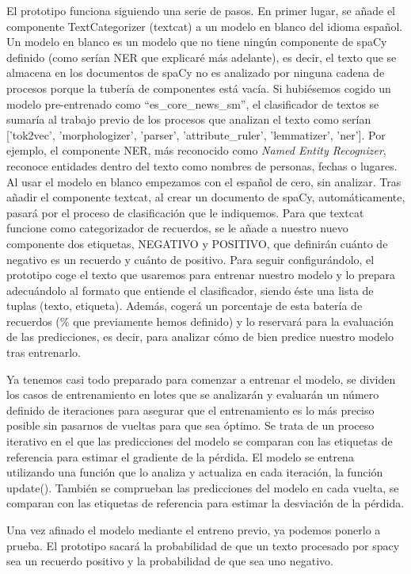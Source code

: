 El prototipo funciona siguiendo una serie de pasos. En primer lugar, se añade el componente TextCategorizer (textcat) a un modelo en blanco del idioma español. Un modelo en blanco es un modelo que no tiene ningún componente de spaCy definido (como serían NER que explicaré más adelante), es decir, el texto que se almacena en los documentos de spaCy no es analizado por ninguna cadena de procesos porque la tubería de componentes está vacía. Si hubiésemos cogido un modelo pre-entrenado como ``es\_core\_news\_sm'', el clasificador de textos se sumaría al trabajo previo de los procesos que analizan el texto como serían ['tok2vec', 'morphologizer', 'parser', 'attribute\_ruler', 'lemmatizer', 'ner']. Por ejemplo, el componente NER, más reconocido como \textit{Named Entity Recognizer}, reconoce entidades dentro del texto como nombres de personas, fechas o lugares. Al usar el modelo en blanco empezamos con el español de cero, sin analizar. Tras añadir el componente textcat, al crear un documento de spaCy, automáticamente, pasará por el proceso de clasificación que le indiquemos. Para que textcat funcione como categorizador de recuerdos, se le añade a nuestro nuevo componente dos etiquetas, NEGATIVO y POSITIVO, que definirán cuánto de negativo es un recuerdo y cuánto de positivo. Para seguir configurándolo, el prototipo coge el texto que usaremos para entrenar nuestro modelo y lo prepara adecuándolo al formato que entiende el clasificador, siendo éste una lista de tuplas (texto, etiqueta). Además, cogerá un porcentaje de esta batería de recuerdos (\% que previamente hemos definido) y lo reservará para la evaluación de las predicciones, es decir, para analizar cómo de bien predice nuestro modelo tras entrenarlo. 

Ya tenemos casi todo preparado para comenzar a entrenar el modelo, se dividen los casos de entrenamiento en lotes que se analizarán y evaluarán un número definido de iteraciones para asegurar que el entrenamiento es lo más preciso posible sin pasarnos de vueltas para que sea óptimo. Se trata de un proceso iterativo en el que las predicciones del modelo se comparan con las etiquetas de referencia para estimar el gradiente de la pérdida. El modelo se entrena utilizando una función que lo analiza y actualiza en cada iteración, la función update(). También se comprueban las predicciones del modelo en cada vuelta, se comparan con las etiquetas de referencia para estimar la desviación de la pérdida.

Una vez afinado el modelo mediante el entreno previo, ya podemos ponerlo a prueba. El prototipo sacará la probabilidad de que un texto procesado por spacy sea un recuerdo positivo y la probabilidad de que sea uno negativo. 

